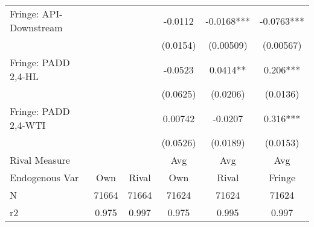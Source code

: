 {\begin{tabular}{l*{5}{c}}
\addlinespace
Fringe: API-Downstream&            &            &  -0.0112   &  -0.0168***&  -0.0763***\\
                &            &            & (0.0154)   &(0.00509)   &(0.00567)   \\
\addlinespace
Fringe: PADD 2,4-HL&            &            &  -0.0523   &   0.0414** &    0.206***\\
                &            &            & (0.0625)   & (0.0206)   & (0.0136)   \\
\addlinespace
Fringe: PADD 2,4-WTI&            &            &  0.00742   &  -0.0207   &    0.316***\\
                &            &            & (0.0526)   & (0.0189)   & (0.0153)   \\
\midrule
Rival Measure   &            &            &      Avg   &      Avg   &      Avg   \\
Endogenous Var  &      Own   &    Rival   &      Own   &    Rival   &   Fringe   \\
N               &    71664   &    71664   &    71624   &    71624   &    71624   \\
r2              &    0.975   &    0.997   &    0.975   &    0.995   &    0.997   \\
\bottomrule
\end{tabular}
}
